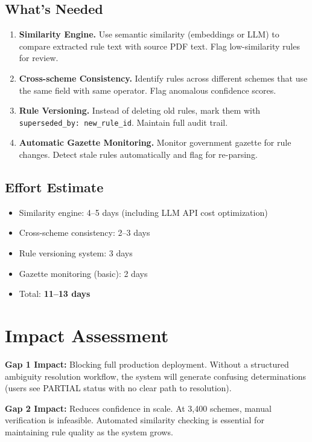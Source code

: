 \documentclass[11pt,a4paper]{report}
\newcommand{\inlinecode}[1]{\texttt{\color{secondary}#1}}
\begin{document}
\subsection{What's Needed}

\begin{enumerate}
  \item \textbf{Similarity Engine.} Use semantic similarity (embeddings or LLM) to compare extracted rule text with source PDF text. Flag low-similarity rules for review.
  \item \textbf{Cross-scheme Consistency.} Identify rules across different schemes that use the same field with same operator. Flag anomalous confidence scores.
  \item \textbf{Rule Versioning.} Instead of deleting old rules, mark them with \inlinecode{superseded\_by: new\_rule\_id}. Maintain full audit trail.
  \item \textbf{Automatic Gazette Monitoring.} Monitor government gazette for rule changes. Detect stale rules automatically and flag for re-parsing.
\end{enumerate}

\subsection{Effort Estimate}

\begin{itemize}
  \item Similarity engine: 4--5 days (including LLM API cost optimization)
  \item Cross-scheme consistency: 2--3 days
  \item Rule versioning system: 3 days
  \item Gazette monitoring (basic): 2 days
  \item Total: \textbf{11--13 days}
\end{itemize}

\section{Impact Assessment}

\textbf{Gap 1 Impact:} Blocking full production deployment. Without a structured ambiguity resolution workflow, the system will generate confusing determinations (users see PARTIAL status with no clear path to resolution).

\textbf{Gap 2 Impact:} Reduces confidence in scale. At 3,400 schemes, manual verification is infeasible. Automated similarity checking is essential for maintaining rule quality as the system grows.
\end{document}
